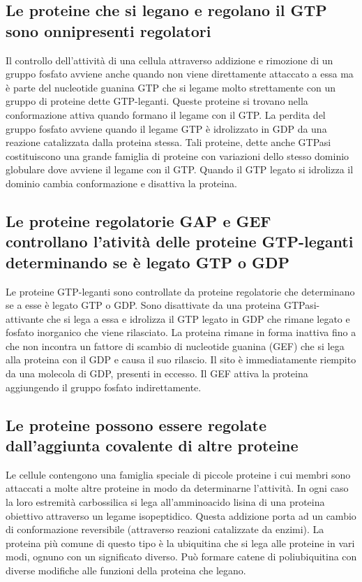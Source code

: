 \subsection{Le proteine che si legano e regolano il GTP sono onnipresenti regolatori}
Il controllo dell'attivit\`a di una cellula attraverso addizione e rimozione di un gruppo fosfato avviene anche quando non viene direttamente attaccato a essa ma \`e parte del nucleotide
guanina GTP che si legame molto strettamente con un gruppo di proteine dette GTP-leganti. Queste proteine si trovano nella conformazione attiva quando formano il legame con il GTP. La
perdita del gruppo fosfato avviene quando il legame GTP \`e idrolizzato in GDP da una reazione catalizzata dalla proteina stessa. Tali proteine, dette anche GTPasi costituiscono una 
grande famiglia di proteine con variazioni dello stesso dominio globulare dove avviene il legame con il GTP. Quando il GTP legato si idrolizza il dominio cambia conformazione e disattiva
la proteina.
\subsection{Le proteine regolatorie GAP e GEF controllano l'ativit\`a delle proteine GTP-leganti determinando se \`e legato GTP o GDP}
Le proteine GTP-leganti sono controllate da proteine regolatorie che determinano se a esse \`e legato GTP o GDP. Sono disattivate da una proteina GTPasi-attivante che si lega a essa e 
idrolizza il GTP legato in GDP che rimane legato e fosfato inorganico che viene rilasciato. La proteina rimane in forma inattiva fino a che non incontra un fattore di scambio di 
nucleotide guanina (GEF) che si lega alla proteina con il GDP e causa il suo rilascio. Il sito \`e immediatamente riempito da una molecola di GDP, presenti in eccesso. Il GEF attiva la
proteina aggiungendo il gruppo fosfato indirettamente. 
\subsection{Le proteine possono essere regolate dall'aggiunta covalente di altre proteine}
Le cellule contengono una famiglia speciale di piccole proteine i cui membri sono attaccati a molte altre proteine in modo da determinarne l'attivit\`a. In ogni caso la loro estremit\`a
carbossilica si lega all'amminoacido lisina di una proteina obiettivo attraverso un legame isopeptidico. Questa addizione porta ad un cambio di conformazione reversibile (attraverso
reazioni catalizzate da enzimi). La proteina pi\`u comune di questo tipo \`e la ubiquitina che si lega alle proteine in vari modi, ognuno con un significato diverso. Pu\`o formare
catene di poliubiquitina con diverse modifiche alle funzioni della proteina che legano.
